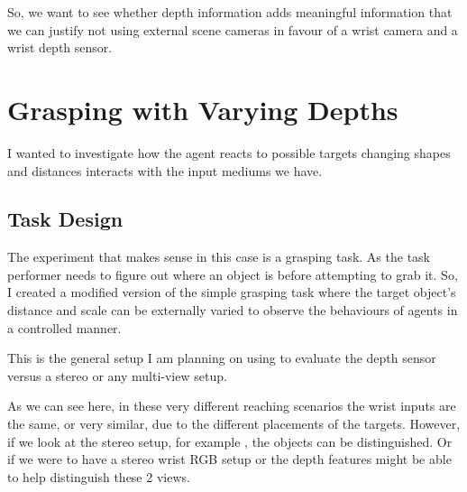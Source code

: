 So,  we want to see whether depth information adds meaningful information that we can justify not using external scene cameras in favour of a wrist camera and a wrist depth sensor.

\section{Grasping with Varying Depths}
I wanted to investigate how the agent reacts to possible targets changing shapes and distances interacts with the input mediums we have.

\subsection{Task Design}
The experiment that makes sense in this case is a grasping task. As the task performer needs to figure out where an object is before attempting to grab it. So, I created a modified version of the simple grasping task where the target object's distance and scale can be externally varied to observe the behaviours of agents in a controlled manner.


This is the general setup I am planning on using to evaluate the depth sensor versus a stereo or any multi-view setup.

As we can see here, in these very different reaching scenarios  the wrist inputs are the same, or very similar, due to the different placements of the targets. However, if we look at the stereo setup, for example , the objects can be distinguished. Or if we were to have a stereo wrist RGB setup  or  the depth features might be able to help distinguish these 2 views.

